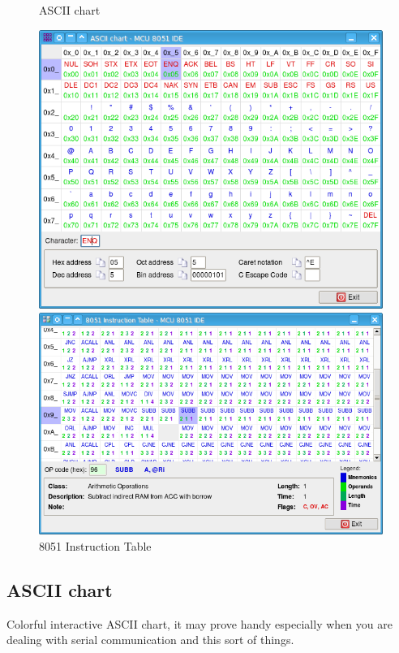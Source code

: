 \documentclass[a4paper,twoside,12pt]{book}
\begin{document}
		\begin{figure}[h!]
			\begin{minipage}[t]{.5\textwidth}
				\centering{}
				\caption{ASCII chart}
				\includegraphics[width=.9\textwidth]{img/039.png}
			\end{minipage}
			\begin{minipage}[t]{.5\textwidth}
				\centering{}
				\caption{8051 Instruction Table}
				\includegraphics[width=.9\textwidth]{img/040.png}
			\end{minipage}
		\end{figure}

		\clearpage
		\subsection{ASCII chart}
			Colorful interactive ASCII chart, it may prove handy especially when you are dealing with serial communication and this sort of things.
\end{document}
